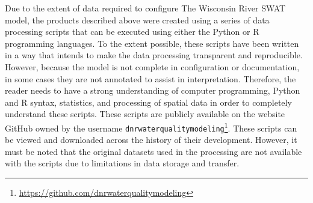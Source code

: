 Due to the extent of data required to configure The Wisconsin River SWAT model, the
products described above were created using a series of data processing scripts
that can be executed using either the Python or R programming languages. To the
extent possible, these scripts have been written in a way that intends to make
the data processing transparent and reproducible. However, because the model is
not complete in configuration or documentation, in some cases they are not
annotated to assist in interpretation. Therefore, the reader needs to have a
strong understanding of computer programming, Python and R syntax, statistics,
and processing of spatial data in order to completely understand these scripts. These scripts are publicly available on the
website GitHub owned by the username
\texttt{dnrwaterqualitymodeling}\footnote{\url{https://github.com/dnrwaterqualitymodeling}}. These scripts can be viewed and downloaded
across the history of their development. However, it must be noted that the
original datasets used in the processing are not available with the scripts due
to limitations in data storage and transfer.

\pagebreak